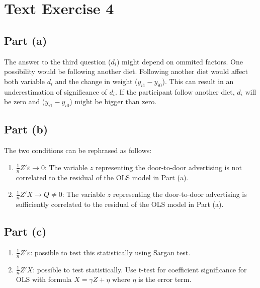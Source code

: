 \documentclass[12pt, a4paper]{article}
\begin{document}
\section*{Text Exercise 4}
\vspace{1em}
\subsection*{Part (a)}
The answer to the third question ($d_i$) might depend on ommited factors. One possibility would be following another diet. Following another diet would affect both variable $d_i$ and the change in weight ($y_{i1} - y_{i0}$). This can result in an underestimation of significance of $d_i$. If the participant follow another diet, $d_i$ will be zero and ($y_{i1} - y_{i0}$) might be bigger than zero.\\
\vspace{1em}
\subsection*{Part (b)}
The two conditions can be rephrased as follows:
\begin{enumerate}
    \item $\frac{1}{n}Z'\varepsilon \to 0$: The variable $z$ representing the door-to-door advertising is not correlated to the residual of the OLS model in Part (a).
    \item $\frac{1}{n}Z'X \to Q\ne0$: The variable $z$ representing the door-to-door advertising is sufficiently correlated to the residual of the OLS model in Part (a).
\end{enumerate}
\vspace{1em}
\subsection*{Part (c)}
\begin{enumerate}
    \item $\frac{1}{n}Z'\varepsilon$: possible to test this statistically using Sargan test.
    \item $\frac{1}{n}Z'X$: possible to test statistically. Use t-test for coefficient significance for OLS with formula $X = \gamma Z + \eta$ where $\eta$ is the error term.
\end{enumerate}
\vspace{1em}
\end{document}
